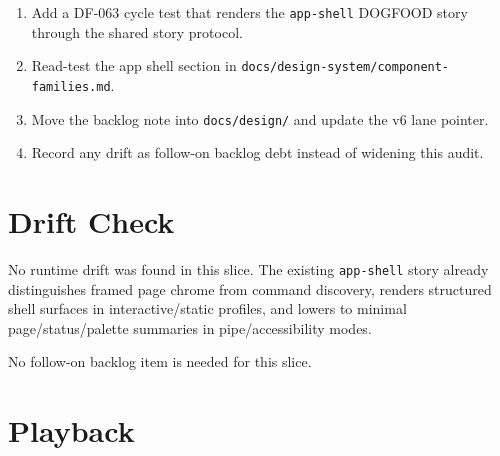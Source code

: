 \begin{enumerate}
\def\labelenumi{\arabic{enumi}.}
\tightlist
\item
  Add a DF-063 cycle test that renders the \texttt{a\allowbreak{}p\allowbreak{}p\allowbreak{}-\allowbreak{}s\allowbreak{}h\allowbreak{}e\allowbreak{}l\allowbreak{}l} DOGFOOD story through the shared story protocol.
\item
  Read-test the app shell section in \texttt{d\allowbreak{}o\allowbreak{}c\allowbreak{}s\allowbreak{}/\allowbreak{}d\allowbreak{}e\allowbreak{}s\allowbreak{}i\allowbreak{}g\allowbreak{}n\allowbreak{}-\allowbreak{}s\allowbreak{}y\allowbreak{}s\allowbreak{}t\allowbreak{}e\allowbreak{}m\allowbreak{}/\allowbreak{}c\allowbreak{}o\allowbreak{}m\allowbreak{}p\allowbreak{}o\allowbreak{}n\allowbreak{}e\allowbreak{}n\allowbreak{}t\allowbreak{}-\allowbreak{}f\allowbreak{}a\allowbreak{}m\allowbreak{}i\allowbreak{}l\allowbreak{}i\allowbreak{}e\allowbreak{}s\allowbreak{}.\allowbreak{}m\allowbreak{}d}.
\item
  Move the backlog note into \texttt{d\allowbreak{}o\allowbreak{}c\allowbreak{}s\allowbreak{}/\allowbreak{}d\allowbreak{}e\allowbreak{}s\allowbreak{}i\allowbreak{}g\allowbreak{}n\allowbreak{}/} and update the v6 lane pointer.
\item
  Record any drift as follow-on backlog debt instead of widening this audit.
\end{enumerate}

\section{Drift Check}\label{record-104-drift-check}

No runtime drift was found in this slice. The existing \texttt{a\allowbreak{}p\allowbreak{}p\allowbreak{}-\allowbreak{}s\allowbreak{}h\allowbreak{}e\allowbreak{}l\allowbreak{}l} story already distinguishes framed page chrome from command discovery, renders structured shell surfaces in interactive/static profiles, and lowers to minimal page/status/palette summaries in pipe/accessibility modes.

No follow-on backlog item is needed for this slice.

\section{Playback}\label{record-104-playback}

